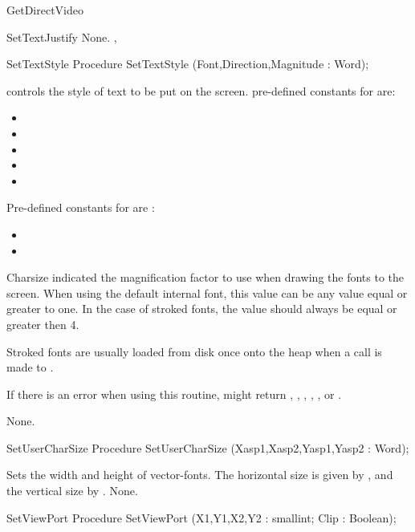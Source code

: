 \begin{function}{GetDirectVideo}
\begin{procedure}{SetTextJustify}
\Errors
None.
\SeeAlso
{}, 
\end{procedure}
\begin{procedure}{SetTextStyle}
\Declaration
Procedure SetTextStyle (Font,Direction,Magnitude : Word);

\Description
{} controls the style of text to be put on the screen.
pre-defined constants for  are:
\begin{itemize}
\item {}
\item {}
\item {}
\item {}
\item {}
\end{itemize}


Pre-defined constants for  are :
\begin{itemize}
\item {}
\item {}
\end{itemize}

Charsize indicated the magnification factor to use when drawing the fonts
to the screen. When using the default internal font, this value can be
any value equal or greater to one. In the case of stroked fonts, the
value should always be equal or greater then 4.

Stroked fonts are usually loaded from disk once onto the heap when a call
is made to .

If there is an error when using this routine,  might return
, , , ,
, or .

\Errors
None.
\SeeAlso
{}
\end{procedure}
\begin{procedure}{SetUserCharSize}
\Declaration
Procedure SetUserCharSize (Xasp1,Xasp2,Yasp1,Yasp2 : Word);

\Description
Sets the width and height of vector-fonts. The horizontal size is given
by , and the vertical size by .
\Errors
None.
\SeeAlso
{}
\end{procedure}
\begin{procedure}{SetViewPort}
\Declaration
Procedure SetViewPort (X1,Y1,X2,Y2 : smallint; Clip : Boolean);


\end{procedure}
\end{function}
